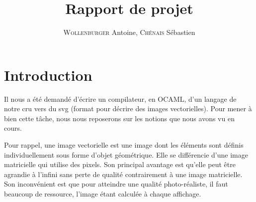 \documentclass[11pt]{report} %
\title{Rapport de projet}
\author{\textsc{Wollenburger} Antoine, \textsc{Chénais} Sébastien}
\date{} %
\renewcommand{\headrulewidth}{0pt} %
\begin{document}
\fancyhead[LE,CE,RE,LO,CO,RO]{}
\fancyfoot[LE,CE,RE,LO,CO,RO]{}

\renewcommand{\headrulewidth}{0.4pt}

\maketitle

\renewcommand{\contentsname}{Sommaire} %
\tableofcontents

\chapter*{Introduction}
Il nous a été demandé d'écrire un compilateur, en OCAML, d'un langage de notre cru vers du svg (format pour décrire des images vectorielles). Pour mener à bien cette tâche, nous nous reposerons sur les notions que nous avons vu en cours.

Pour rappel, une image vectorielle est une image dont les éléments sont définis individuellement sous forme d'objet géométrique. Elle se différencie d'une image matricielle qui utilise des pixels. Son principal avantage est qu'elle peut être agrandie à l'infini sans perte de qualité contrairement à une image matricielle. Son inconvénient est que pour atteindre une qualité photo-réaliste, il faut beaucoup de ressource, l'image étant calculée à chaque affichage.
\end{document}
